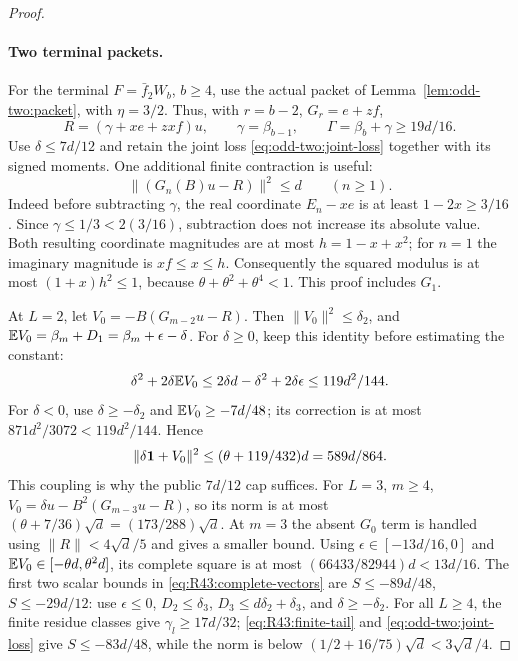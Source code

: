 \begin{proof}
\paragraph{Two terminal packets.}\label{part:R43:packets}
For the terminal \(F=\bar f_2W_b\), \(b\ge4\), use the actual
packet of Lemma~\ref{lem:odd-two:packet}, with \(\eta=3/2\).
Thus, with \(r=b-2\), \(G_r=e+zf\),
\[
 R=(\gamma+xe+zxf)u,\qquad
 \gamma=\beta_{b-1},\qquad \Gamma=\beta_b+\gamma\ge19d/16.
\]
Use \(\delta\le7d/12\) and retain the joint loss
\eqref{eq:odd-two:joint-loss} together with its signed moments.
One additional finite contraction is useful:
\begin{equation}\label{eq:R43:packet-contraction}
 \|(G_n(B)u-R)\|^2\le d\qquad(n\ge1).
\end{equation}
Indeed before subtracting \(\gamma\), the real coordinate
\(E_n-xe\) is at least \(1-2x\ge3/16\). Since
\(\gamma\le1/3<2(3/16)\), subtraction does not increase its absolute
value. Both resulting coordinate magnitudes are at most
\(h=1-x+x^2\); for \(n=1\) the imaginary magnitude is \(xf\le x\le h\).
Consequently the squared modulus is at most
\((1+x)h^2\le1\), because
\(\theta+\theta^2+\theta^4<1\). This proof includes \(G_1\).

At \(L=2\), let \(V_0=-B(G_{m-2}u-R)\). Then
\(\|V_0\|^2\le\delta_2\), and
\(\mathbb E V_0=\beta_m+D_1=\beta_m+\epsilon-\delta\).
For \(\delta\ge0\), keep this identity before estimating the constant:
\[
 \delta^2+2\delta\mathbb E V_0
 \le2\delta d-\delta^2+2\delta\epsilon
 \le119d^2/144.
\]
For \(\delta<0\), use \(\delta\ge-\delta_2\) and
\(\mathbb E V_0\ge-7d/48\); its correction is at most
\(871d^2/3072<119d^2/144\). Hence
\begin{equation}\label{eq:R43:two-coupled-norm}
 \|\delta\mathbf1+V_0\|^2\le(\theta+119/432)d=589d/864.
\end{equation}
This coupling is why the public \(7d/12\) cap suffices.
For \(L=3\), \(m\ge4\),
\(V_0=\delta u-B^2(G_{m-3}u-R)\), so its norm is at most
\((\theta+7/36)\sqrt d=(173/288)\sqrt d\).
At \(m=3\) the absent \(G_0\) term is handled using
\(\|R\|<4\sqrt d/5\) and gives a smaller bound.
Using \(\epsilon\in[-13d/16,0]\) and
\(\mathbb E V_0\in[-\theta d,\theta^2d]\), its complete square is at most
\((66433/82944)d<13d/16\).
The first two scalar bounds in \eqref{eq:R43:complete-vectors} are
\(S\le-89d/48\), \(S\le-29d/12\): use
\(\epsilon\le0\), \(D_2\le\delta_3\),
\(D_3\le d\delta_2+\delta_3\), and \(\delta\ge-\delta_2\).
For all \(L\ge4\), the finite residue classes give
\(\gamma_l\ge17d/32\); \eqref{eq:R43:finite-tail} and
\eqref{eq:odd-two:joint-loss} give \(S\le-83d/48\),
while the norm is below \((1/2+16/75)\sqrt d<3\sqrt d/4\).


\end{proof}
